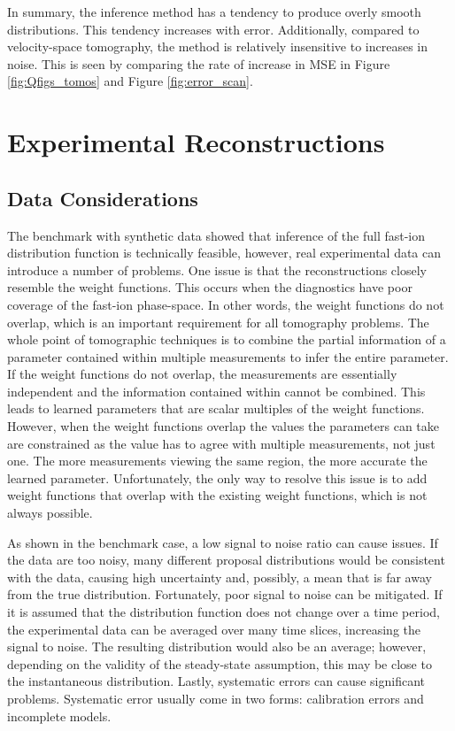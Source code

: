 In summary, the inference method has a tendency to produce overly smooth distributions. This tendency increases with error. Additionally, compared to velocity-space tomography, the method is relatively insensitive to increases in noise. This is seen by comparing the rate of increase in MSE in Figure \ref{fig:Qfigs_tomos} and Figure \ref{fig:error_scan}.  

\section{Experimental Reconstructions}\label{sec:experiment}
\subsection{Data Considerations}
The benchmark with synthetic data showed that inference of the full fast-ion distribution function is technically feasible, however, real experimental data can introduce a number of problems.
One issue is that the reconstructions closely resemble the weight functions.
This occurs when the diagnostics have poor coverage of the fast-ion phase-space.
In other words, the weight functions do not overlap, which is an important requirement for all tomography problems.
The whole point of tomographic techniques is to combine the partial information of a parameter contained within multiple measurements to infer the entire parameter. 
If the weight functions do not overlap, the measurements are essentially independent and the information contained within cannot be combined. This leads to learned parameters that are scalar multiples of the weight functions. However, when the weight functions overlap the values the parameters can take are constrained as the value has to agree with multiple measurements, not just one. The more measurements viewing the same region, the more accurate the learned parameter. 
Unfortunately, the only way to resolve this issue is to add weight functions that overlap with the existing weight functions, which is not always possible.

As shown in the benchmark case, a low signal to noise ratio can cause issues. 
If the data are too noisy, many different proposal distributions would be consistent with the data, causing high uncertainty and, possibly, a mean that is far away from the true distribution.
Fortunately, poor signal to noise can be mitigated. If it is assumed that the distribution function does not change over a time period, the experimental data can be averaged over many time slices, increasing the signal to noise. The resulting distribution would also be an average; however, depending on the validity of the steady-state assumption, this may be close to the instantaneous distribution.
Lastly, systematic errors can cause significant problems.
Systematic error usually come in two forms: calibration errors and incomplete models.


